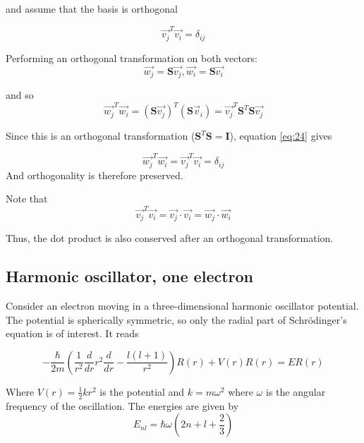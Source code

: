 \documentclass[a4paper,11pt]{article}
\begin{document}
and assume that the basis is orthogonal

\begin{equation}\label{eq:22}
\vec{v_j}^T \vec{v_i} = \delta_{ij}
\end{equation}

Performing an orthogonal transformation on both vectors:
\begin{equation}\label{eq:23}
\vec{w_j} = \mathbf S \vec{v_j}, \vec{w_i} = \mathbf S \vec{v_i}
\end{equation}
 
and so 
\begin{equation}\label{eq:24}
\vec{w_j}^T \vec{w_i} = (\mathbf S \vec{v_j})^T ( \mathbf S \vec v_i ) = \vec{v_j}^T \mathbf{S}^T \mathbf S \vec{v_j}
\end{equation}

Since this is an orthogonal transformation ($\mathbf{S}^T \mathbf{S} = \mathbf{I}$), equation \ref{eq:24} gives

\begin{equation}\label{eq:25}
\vec{w_j}^T \vec{w_i} = \vec{v_j}^T \vec{v_i} = \delta_{ij}
\end{equation}
And orthogonality is therefore preserved. 

Note that 
\begin{equation}\label{eq:26}
\vec{v_j}^T\vec{v_i} = \vec{v_j} \cdot \vec{v_i} = \vec{w_j}\cdot \vec{w_i}
\end{equation}

Thus, the dot product is also conserved after an orthogonal transformation. 

\subsection{Harmonic oscillator, one electron}

Consider an electron moving in a three-dimensional harmonic oscillator potential. The potential is spherically symmetric, so only the radial part of Schrödinger's equation is of interest. It reads \cite{Project2}

\begin{equation}\label{eq:27}
    -\frac{\hbar}{2m}\left(\frac{1}{r^2} \frac{d}{dr}r^2 \frac{d}{dr} - \frac{l(l+1)}{r^2} \right) R(r) + V(r)R(r) = E R(r)
\end{equation}

Where $V(r) = \frac{1}{2}kr^2$ is the potential and $k = m\omega^2$ where $\omega$ is the angular frequency of the oscillation. The energies are given by 
\begin{equation}\label{eq:28}
    E_{nl} = \hbar \omega \left( 2n + l + \frac{2}{3} \right) 
\end{equation}
\end{document}

